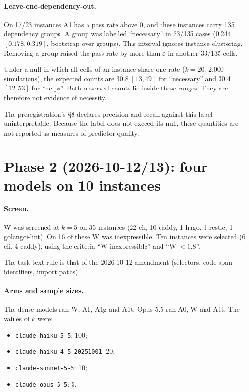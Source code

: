 \documentclass[11pt,a4paper]{article}
\newcommand{\eps}{\varepsilon}
\begin{document}
\paragraph{Leave-one-dependency-out.}
On 17/23 instances A1 has a pass rate above 0, and these instances carry 135 dependency groups. A group was labelled ``necessary'' in 33/135 cases (0.244 $[0.178, 0.319]$, bootstrap over groups). This interval ignores instance clustering. Removing a group raised the pass rate by more than $\eps$ in another 33/135 cells.

Under a null in which all cells of an instance share one rate ($k=20$, 2,000 simulations), the expected counts are 30.8 $[13, 49]$ for ``necessary'' and 30.4 $[12, 53]$ for ``helps''. Both observed counts lie inside these ranges. They are therefore not evidence of necessity.

The preregistration's §8 declares precision and recall against this label uninterpretable. Because the label does not exceed its null, these quantities are not reported as measures of predictor quality.

\section{Phase 2 (2026-10-12/13): four models on 10 instances}

\paragraph{Screen.}
W was screened at $k=5$ on 35 instances (22 cli, 10 caddy, 1 hugo, 1 restic, 1 golangci-lint). On 16 of these W was inexpressible. Ten instances were selected (6 cli, 4 caddy), using the criteria ``W inexpressible'' and ``W $< 0.8$''.

The task-text rule is that of the 2026-10-12 amendment (selectors, code-span identifiers, import paths).

\paragraph{Arms and sample sizes.}
The dense models ran W, A1, A1g and A1t. Opus 5.5 ran A0, W and A1t. The values of $k$ were:
\begin{itemize}
\item \texttt{claude-haiku-5-5}: 100;
\item \texttt{claude-haiku-4-5-20251001}: 20;
\item \texttt{claude-sonnet-5-5}: 10;
\item \texttt{claude-opus-5-5}: 5.
\end{itemize}
\end{document}
